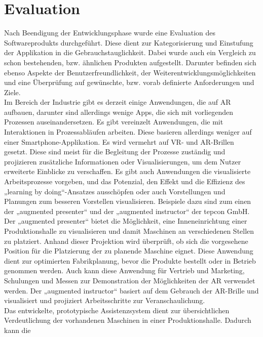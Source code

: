 \chapter{Evaluation}
\label{chap:Evaluation}
Nach Beendigung der Entwicklungsphase wurde eine Evaluation des Softwareprodukts durchgeführt. Diese dient zur Kategorisierung und Einstufung der Applikation in 
die Gebrauchstauglichkeit. Dabei wurde auch ein Vergleich zu schon bestehenden, bzw. ähnlichen Produkten aufgestellt. Darunter befinden sich 
ebenso Aspekte der Benutzerfreundlichkeit, der Weiterentwicklungsmöglichkeiten und eine Überprüfung auf gewünschte, bzw. vorab definierte Anforderungen 
und Ziele. 
\\ 
\linebreak
Im Bereich der Industrie gibt es derzeit einige Anwendungen, die auf \acl{AR} aufbauen, darunter sind allerdings wenige Apps, die sich mit vorliegenden Prozessen 
auseinandersetzen. Es gibt vereinzelt Anwendungen, die mit Interaktionen in Prozessabläufen arbeiten. Diese basieren allerdings weniger auf 
einer Smartphone-Applikation. Es wird vermehrt auf \acs{VR}- und \acs{AR}-Brillen gesetzt. Diese sind meist für die Begleitung der 
Prozesse zuständig und projizieren zusätzliche Informationen oder Visualisierungen, um dem Nutzer erweiterte Einblicke zu verschaffen. Es gibt auch 
Anwendungen die visualisierte Arbeitsprozesse vorgeben, und das Potenzial, den Effekt und die Effizienz des „learning by doing“-Ansatzes ausschöpfen oder auch 
Vorstellungen und Planungen zum besseren Vorstellen visualisieren. Beispiele dazu sind zum einen der „augmented presenter“ \cite{tepcon.2020} 
und der „augmented instructor“ \cite{tepcon.2020} der tepcon GmbH. Der „augmented presenter“ bietet die Möglichkeit, eine Inneneinrichtung einer Produktionshalle 
zu visualisieren und damit Maschinen an verschiedenen Stellen zu platziert. Anhand dieser Projektion wird überprüft, ob sich die vorgesehene Position 
für die Platzierung der zu planende Maschine eignet. Diese Anwendung dient zur optimierten Fabrikplanung, bevor die Produkte bestellt oder in Betrieb genommen 
werden. Auch kann diese Anwendung für Vertrieb und Marketing, Schulungen und Messen zur Demonstration der Möglichkeiten der \acs{AR} verwendet werden. Der 
„augmented instructor“ basiert auf dem Gebrauch der \acs{AR}-Brille und visualisiert und projiziert Arbeitsschritte zur Veranschaulichung. 
\\ 
\linebreak
Das entwickelte, prototypische Assistenzsystem dient zur übersichtlichen Verdeutlichung der vorhandenen Maschinen in einer Produktionshalle. Dadurch kann die 
